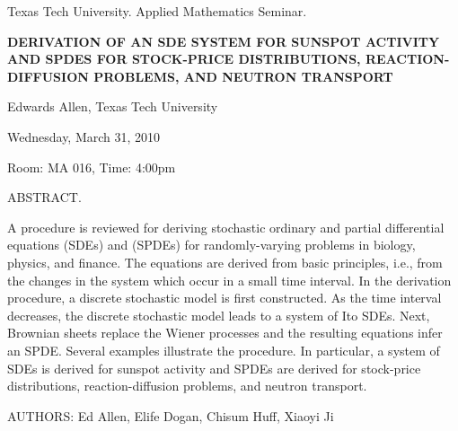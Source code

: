 \documentclass[oneside]{amsart}
\newcommand{\talktitle}{Derivation of an SDE system for sunspot activity and SPDEs for 
stock-price distributions, reaction-diffusion problems, and neutron transport}
\newcommand{\talkspeaker}{Edwards Allen, Texas Tech University}
\newcommand{\talkdate}{Wednesday, March 31, 2010}
\newcommand{\talkabstract}{
A procedure is reviewed for deriving stochastic ordinary and partial
differential equations (SDEs) and (SPDEs) for randomly-varying
problems in biology, physics, and finance. The equations are
derived from basic principles, i.e., from the changes in the
system which occur in a small time interval. In the derivation
procedure, a discrete stochastic model is first constructed. As
the time interval decreases, the discrete stochastic model leads
to a system of Ito SDEs. Next, Brownian sheets replace the Wiener
processes and the resulting equations infer an SPDE. Several
examples illustrate the procedure. In particular, a system of SDEs
is derived for sunspot activity and SPDEs are derived for
stock-price distributions, reaction-diffusion problems, and
neutron transport.

AUTHORS: Ed Allen, Elife Dogan, Chisum Huff, Xiaoyi Ji
}
\begin{document}
\thispagestyle{empty}

\begin{center}
Texas Tech University.  Applied Mathematics Seminar.

\end{center}

\begin{center}

\textbf{\LARGE {\uppercase{\talktitle}} }

\talkspeaker

\talkdate

Room: MA 016, Time: 4:00pm

\end{center}

ABSTRACT.
\talkabstract
\end{document}
